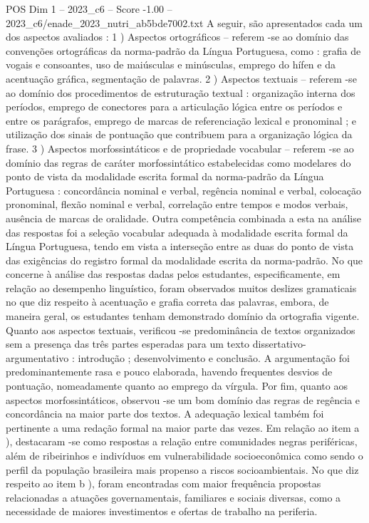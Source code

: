 \begin{textsample}{POS Dim 1 – 2023\_c6 – Score -1.00 – 2023\_c6/enade\_2023\_nutri\_ab5bde7002.txt}
A seguir, são apresentados cada um dos aspectos avaliados : 1 ) Aspectos ortográficos – referem -se ao domínio das convenções ortográficas da norma-padrão da Língua Portuguesa, como : grafia de vogais e consoantes, uso de maiúsculas e minúsculas, emprego do hífen e da acentuação gráfica, segmentação de palavras. 2 ) Aspectos textuais – referem -se ao domínio dos procedimentos de estruturação textual : organização interna dos períodos, emprego de conectores para a articulação lógica entre os períodos e entre os parágrafos, emprego de marcas de referenciação lexical e pronominal ; e utilização dos sinais de pontuação que contribuem para a organização lógica da frase. 3 ) Aspectos morfossintáticos e de propriedade vocabular – referem -se ao domínio das regras de caráter morfossintático estabelecidas como modelares do ponto de vista da modalidade escrita formal da norma-padrão da Língua Portuguesa : concordância nominal e verbal, regência nominal e verbal, colocação pronominal, flexão nominal e verbal, correlação entre tempos e modos verbais, ausência de marcas de oralidade.
Outra competência combinada a esta na análise das respostas foi a seleção vocabular adequada à modalidade escrita formal da Língua Portuguesa, tendo em vista a interseção entre as duas do ponto de vista das exigências do registro formal da modalidade escrita da norma-padrão.
No que concerne à análise das respostas dadas pelos estudantes, especificamente, em relação ao desempenho linguístico, foram observados muitos deslizes gramaticais no que diz respeito à acentuação e grafia correta das palavras, embora, de maneira geral, os estudantes tenham demonstrado domínio da ortografia vigente.
Quanto aos aspectos textuais, verificou -se predominância de textos organizados sem a presença das três partes esperadas para um texto dissertativo-argumentativo : introdução ; desenvolvimento e conclusão.
A argumentação foi predominantemente rasa e pouco elaborada, havendo frequentes desvios de pontuação, nomeadamente quanto ao emprego da vírgula.
Por fim, quanto aos aspectos morfossintáticos, observou -se um bom domínio das regras de regência e concordância na maior parte dos textos.
A adequação lexical também foi pertinente a uma redação formal na maior parte das vezes.
Em relação ao item a ), destacaram -se como respostas a relação entre comunidades negras periféricas, além de ribeirinhos e indivíduos em vulnerabilidade socioeconômica como sendo o perfil da população brasileira mais propenso a riscos socioambientais.
No que diz respeito ao item b ), foram encontradas com maior frequência propostas relacionadas a atuações governamentais, familiares e sociais diversas, como a necessidade de maiores investimentos e ofertas de trabalho na periferia.

\end{textsample}
